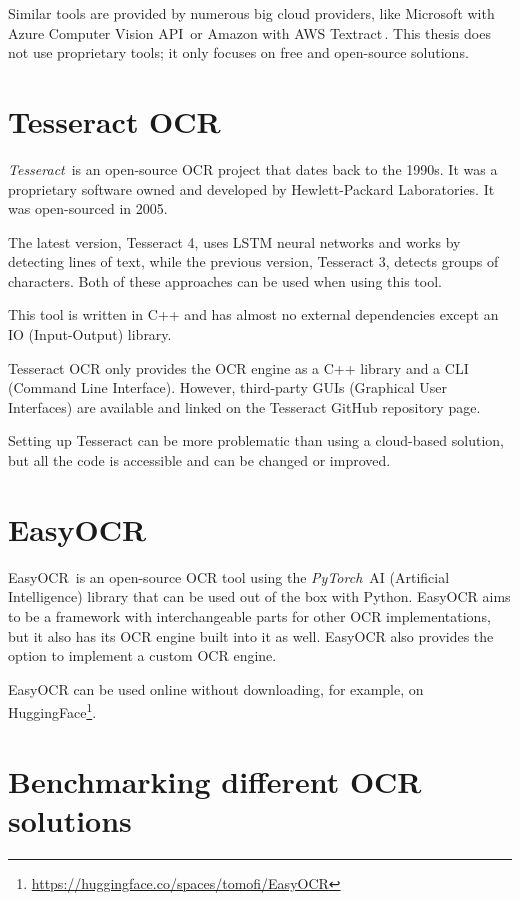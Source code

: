 \documentclass[
  digital,     %
  oneside,     %
  nosansbold,  %
  nocolorbold, %
  nolof,         %
  nolot,         %
]{fithesis4}
\begin{document}
Similar tools are provided by numerous big cloud providers, like Microsoft with Azure Computer Vision API\,\cite{azurevision} or Amazon with AWS Textract\,\cite{awstextract}. This thesis does not use proprietary tools; it only focuses on free and open-source solutions.

\section{Tesseract OCR}

\emph{Tesseract}\,\cite{tesseract} is an open-source OCR project that dates back to the 1990s. It was a proprietary software owned and developed by Hewlett-Packard Laboratories. It was open-sourced in 2005.

The latest version, Tesseract 4, uses LSTM neural networks and works by detecting lines of text, while the previous version, Tesseract 3, detects groups of characters. Both of these approaches can be used when using this tool.

This tool is written in C++ and has almost no external dependencies except an IO (Input-Output) library.

Tesseract OCR only provides the OCR engine as a C++ library and a CLI (Command Line Interface). However, third-party GUIs (Graphical User Interfaces) are available and linked on the Tesseract GitHub repository page.

Setting up Tesseract can be more problematic than using a cloud-based solution, but all the code is accessible and can be changed or improved.

\section{EasyOCR}

EasyOCR\,\cite{easyocr} is an open-source OCR tool using the \emph{PyTorch}\,\cite{pytorch} AI (Artificial Intelligence) library that can be used out of the box with Python. EasyOCR aims to be a framework with interchangeable parts for other OCR implementations, but it also has its OCR engine built into it as well. EasyOCR also provides the option to implement a custom OCR engine.

EasyOCR can be used online without downloading, for example, on HuggingFace\footnote{\href{https://huggingface.co/spaces/tomofi/EasyOCR}{https://huggingface.co/spaces/tomofi/EasyOCR}}.

\section{Benchmarking different OCR solutions}
\end{document}
